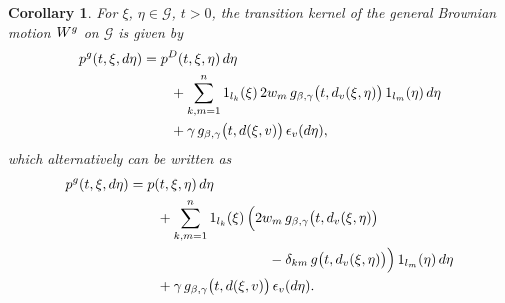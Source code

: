 \documentclass[11pt,a4paper]{amsart}
\newcommand{\gb}{\beta}
\newcommand{\gd}{\delta}
\newcommand{\gep}{\epsilon}
\renewcommand{\gg}{\gamma}
\newcommand{\cG}{\mathcal{G}}
\newcommand{\1}{1}
\newtheorem{corollary}[theorem]{Corollary}
\theoremstyle{remark}
\newcommand{\onel}[1][k]{\ensuremath1_{l_{#1}}}
\newcommand{\Wg}{\ensuremath W^g}
\newcommand{\pg}{\ensuremath p^g}
\numberwithin{equation}{section}
\begin{document}
\begin{corollary}   \label{cor5.6}
For $\xi$, $\eta\in\cG$, $t>0$, the transition kernel of the general Brownian
motion $\Wg$ on $\cG$ is given  by
\begin{equation}    \label{eq5.14}
\begin{split}
    \pg(t,\xi,d\eta)
        &= p^D(t,\xi,\eta)\,d\eta\\
        &\hspace{2em} +\sum_{k,m=1}^n \onel(\xi)\,2w_m\,g_{\gb,\gg}\bigl(t,d_v(\xi,\eta)\bigr)\,
                                \onel[m](\eta)\,d\eta\\
        &\hspace{2em} + \gg\,g_{\gb,\gg}\bigl(t,d(\xi,v)\bigr)\,\gep_v(d\eta),
\end{split}
\end{equation}
which alternatively can be written as
\begin{equation}    \label{eq5.15}
\begin{split}
    \pg(t,\xi,d\eta)
        &= p(t,\xi,\eta)\,d\eta\\
        &\hspace{2em} +\sum_{k,m=1}^n \onel(\xi)\,\Bigl(2w_m\,g_{\gb,\gg}\bigl(t,d_v(\xi,\eta)\bigr)\\
        &\hspace{10em} -\gd_{km}\,g\bigl(t,d_v(\xi,\eta)\bigr)\Bigl)\,
                                \onel[m](\eta)\,d\eta\\
        &\hspace{2em} + \gg\,g_{\gb,\gg}\bigl(t,d(\xi,v)\bigr)\,\gep_v(d\eta).
\end{split}
\end{equation}
\end{corollary}
\end{document}
